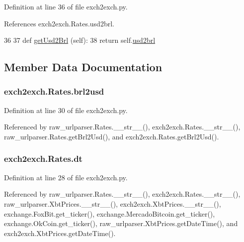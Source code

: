 Definition at line 36 of file exch2exch.\-py.



References exch2exch.\-Rates.\-usd2brl.


\begin{DoxyCode}
36 
37     \textcolor{keyword}{def }\hyperlink{classexch2exch_1_1_rates_a1b3705806d2321660c4c2753474f403d}{getUsd2Brl} (self):
38         \textcolor{keywordflow}{return} self.\hyperlink{classexch2exch_1_1_rates_ab79ad6e4a42ca358e6b39c825a4b8a0b}{usd2brl}
    
\end{DoxyCode}


\subsection{Member Data Documentation}
\hypertarget{classexch2exch_1_1_rates_acc018dea09e825e18e91c73c5c63ab78}{
\subsubsection[{brl2usd}]{\setlength{\rightskip}{0pt plus 5cm}exch2exch.\-Rates.\-brl2usd}}\label{classexch2exch_1_1_rates_acc018dea09e825e18e91c73c5c63ab78}


Definition at line 30 of file exch2exch.\-py.



Referenced by raw\-\_\-urlparser.\-Rates.\-\_\-\-\_\-str\-\_\-\-\_\-(), exch2exch.\-Rates.\-\_\-\-\_\-str\-\_\-\-\_\-(), raw\-\_\-urlparser.\-Rates.\-get\-Brl2\-Usd(), and exch2exch.\-Rates.\-get\-Brl2\-Usd().

\hypertarget{classexch2exch_1_1_rates_acb12f83bce4393714ec30351a1d636c2}{
\subsubsection[{dt}]{\setlength{\rightskip}{0pt plus 5cm}exch2exch.\-Rates.\-dt}}\label{classexch2exch_1_1_rates_acb12f83bce4393714ec30351a1d636c2}


Definition at line 28 of file exch2exch.\-py.



Referenced by raw\-\_\-urlparser.\-Rates.\-\_\-\-\_\-str\-\_\-\-\_\-(), exch2exch.\-Rates.\-\_\-\-\_\-str\-\_\-\-\_\-(), raw\-\_\-urlparser.\-Xbt\-Prices.\-\_\-\-\_\-str\-\_\-\-\_\-(), exch2exch.\-Xbt\-Prices.\-\_\-\-\_\-str\-\_\-\-\_\-(), exchange.\-Fox\-Bit.\-get\-\_\-ticker(), exchange.\-Mercado\-Bitcoin.\-get\-\_\-ticker(), exchange.\-Ok\-Coin.\-get\-\_\-ticker(), raw\-\_\-urlparser.\-Xbt\-Prices.\-get\-Date\-Time(), and exch2exch.\-Xbt\-Prices.\-get\-Date\-Time().

